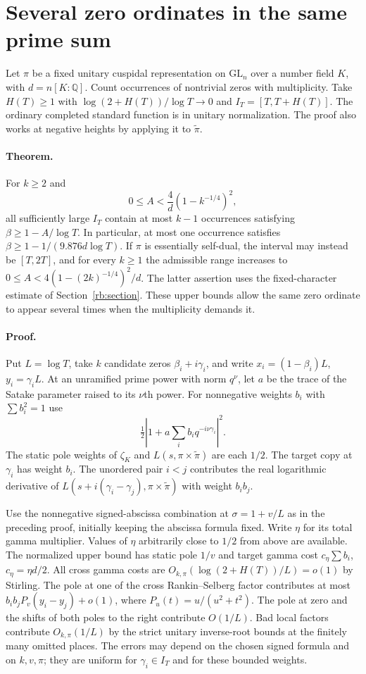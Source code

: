 \documentclass[11pt]{article}
\begin{document}
\section{Several zero ordinates in the same prime sum}\label{sec:occupation}
Let $\pi$ be a fixed unitary cuspidal representation on $\mathrm{GL}_n$
over a number field $K$, with $d=n[K:\mathbb Q]$. Count occurrences of
nontrivial zeros with multiplicity. Take $H(T)\ge1$ with
$\log(2+H(T))/\log T\to0$ and $I_T=[T,T+H(T)]$. The ordinary completed
standard function is in unitary normalization. The proof also works at
negative heights by applying it to $\widetilde\pi$.

\paragraph{Theorem.}
For $k\ge2$ and
\[
   0\le A<\frac{4}{d}(1-k^{-1/4})^2,
\]
all sufficiently large $I_T$ contain at most $k-1$ occurrences satisfying
$\beta\ge1-A/\log T$. In particular, at most one occurrence satisfies
$\beta\ge1-1/(9.876d\log T)$. If $\pi$ is essentially self-dual, the
interval may instead be $[T,2T]$, and for every $k\ge1$ the admissible
range increases to $0\le A<4(1-(2k)^{-1/4})^2/d$.
The latter assertion uses the fixed-character estimate of Section~\ref{rb:section}. These upper bounds allow the same zero ordinate to appear
several times when the multiplicity demands it.

\paragraph{Proof.}
Put $L=\log T$, take $k$ candidate zeros $\beta_i+i\gamma_i$, and write
$x_i=(1-\beta_i)L$, $y_i=\gamma_iL$. At an unramified prime power with
norm $q^\nu$, let $a$ be the trace of the Satake parameter raised to its
$\nu$th power. For nonnegative weights $b_i$ with $\sum b_i^2=1$ use
\[
  \tfrac12\left|1+a\sum_i b_i q^{-i\nu\gamma_i}\right|^2 .
\]
The static pole weights of $\zeta_K$ and $L(s,\pi\times\widetilde\pi)$
are each $1/2$. The target copy at $\gamma_i$ has weight $b_i$.
The unordered pair $i<j$ contributes the real logarithmic derivative of
$L(s+i(\gamma_i-\gamma_j),\pi\times\widetilde\pi)$ with weight $b_ib_j$.

Use the nonnegative signed-abscissa combination at $\sigma=1+v/L$ as in
the preceding proof, initially keeping the abscissa formula fixed. Write
$\eta$ for its total gamma multiplier. Values of $\eta$ arbitrarily close
to $1/2$ from above are available. The normalized upper bound has static
pole $1/v$ and target gamma cost $c_\eta\sum b_i$, $c_\eta=\eta d/2$.
All cross gamma costs are $O_{k,\pi}(\log(2+H(T))/L)=o(1)$ by Stirling.
The pole at one of the cross Rankin--Selberg factor contributes at most
$b_ib_j P_v(y_i-y_j)+o(1)$, where $P_u(t)=u/(u^2+t^2)$.
The pole at zero and the shifts of both poles to the right contribute
$O(1/L)$. Bad local factors contribute $O_{k,\pi}(1/L)$ by the strict
unitary inverse-root bounds at the finitely many omitted places.
The errors may depend on the chosen signed formula and on $k,v,\pi$;
they are uniform for $\gamma_i\in I_T$ and for these bounded weights.
\end{document}
